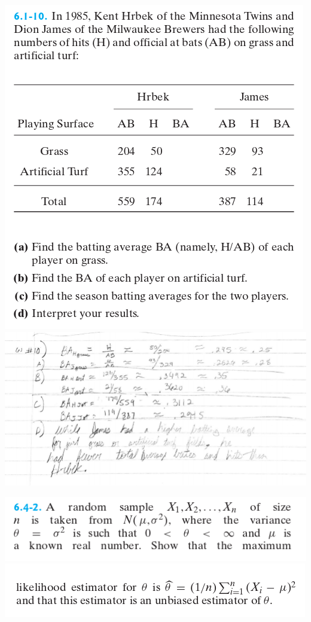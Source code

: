 \documentclass[11pt]{article}
\makeatletter
\def\maxwidth{\ifdim\Gin@nat@width>\linewidth\linewidth
    \else\Gin@nat@width\fi}
\let\Oldincludegraphics\includegraphics
\renewcommand{\includegraphics}[1]{\Oldincludegraphics[width=.8\maxwidth]{#1}}
\makeatother
\begin{document}
    \includegraphics{images/num2.png} \includegraphics{images/solution2.png}

    \includegraphics{images/num3.1.png} \includegraphics{images/num3.2.png}
\end{document}
